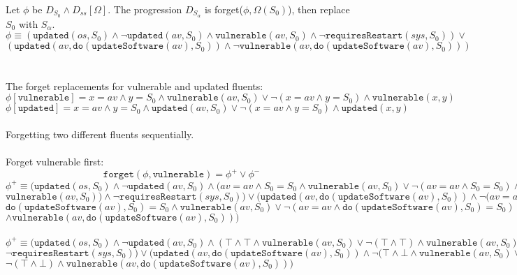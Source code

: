 \documentclass{assignment}
\begin{document}
\begin{problem}
Let $\phi$ be $D_{S_0} \land D_{ss}[\Omega]$. The progression $D_{S_\alpha}$ is forget($\phi, \Omega(S_0)$), then replace $S_0$ with $S_\alpha$.\\
\[\phi\equiv(\texttt{updated}(os, S_0) \land \neg \texttt{updated}(av, S_0) \land \texttt{vulnerable}(av, S_0) \land \neg \texttt{requiresRestart}(sys, S_0)) \lor \]
\[(\texttt{updated}(av, \texttt{do}(\texttt{updateSoftware}(av), S_0))\land \neg\texttt{vulnerable}(av, \texttt{do}(\texttt{updateSoftware}(av), S_0)))\]
\\
\\
The forget replacements for vulnerable and updated fluents:
\[\phi[\texttt{vulnerable}] = x=av \land y=S_0 \land \texttt{vulnerable}(av, S_0) \lor \neg(x=av \land y=S_0) \land \texttt{vulnerable}(x, y)\]
\[\phi[\texttt{updated}] = x=av\land y=S_0\land \texttt{updated}(av, S_0) \lor \neg(x=av\land y=S_0)\land \texttt{updated}(x, y)\]
\\
Forgetting two different fluents sequentially. \\
\\
Forget vulnerable first:
\[\texttt{forget}(\phi, \texttt{vulnerable}) = \phi^{+}\lor\phi^-\]
\(\phi^+\equiv(\texttt{updated}(os, S_0) \land \neg \texttt{updated}(av, S_0) \land (av=av \land S_0=S_0 \land \texttt{vulnerable}(av, S_0) \lor \neg(av=av \land S_0=S_0) \land   \)\\
\(\texttt{vulnerable}(av, S_0)) \land\neg \texttt{requiresRestart}(sys, S_0)) \lor(\texttt{updated}(av, \texttt{do}(\texttt{updateSoftware}(av), S_0))\land \neg(av=av \land\)\\
\(  \texttt{do}(\texttt{updateSoftware}(av), S_0)=S_0 \land \texttt{vulnerable}(av, S_0) \lor \neg(av=av \land \texttt{do}(\texttt{updateSoftware}(av), S_0)=S_0) \)\\
\(\land \texttt{vulnerable}(av, \texttt{do}(\texttt{updateSoftware}(av), S_0)))\)\\
\\
\(\phi^+\equiv(\texttt{updated}(os, S_0) \land \neg \texttt{updated}(av, S_0) \land (\top \land \top \land \texttt{vulnerable}(av, S_0) \lor \neg(\top \land \top) \land  \texttt{vulnerable}(av, S_0)) \land \)\\
\(\neg \texttt{requiresRestart}(sys, S_0)) \lor(\texttt{updated}(av, \texttt{do}(\texttt{updateSoftware}(av), S_0))\land \neg(\top \land \bot \land \texttt{vulnerable}(av, S_0) \lor\)\\
\(  \neg(\top \land \bot) \land \texttt{vulnerable}(av, \texttt{do}(\texttt{updateSoftware}(av), S_0)))\)\\

\end{problem}
\end{document}
